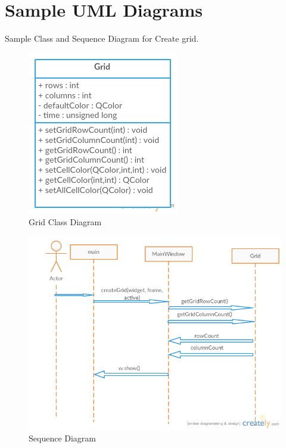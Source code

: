 \documentclass[12pt,a4paper]{article}
\begin{document}
\section{Sample UML Diagrams}
Sample Class and Sequence Diagram for Create grid.
\begin{figure}
\centering
\includegraphics{GridClassDiagram-2.png}
\caption{Grid Class Diagram}
\end{figure}
\begin{figure}
\centering
\includegraphics[width = \textwidth]{CreateGridSequenceDiagram.png}
\caption{Sequence Diagram}
\end{figure}
\end{document}
